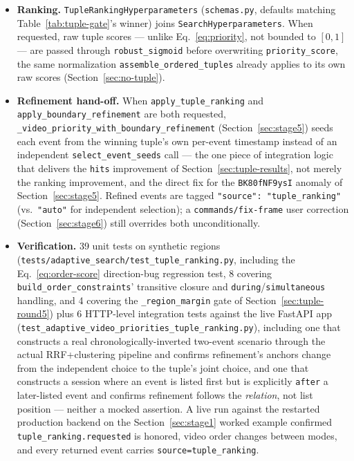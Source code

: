 \documentclass[11pt]{article}
\newcommand{\code}[1]{\texttt{\small #1}}
\newcommand{\file}[1]{\texttt{\footnotesize #1}}
\begin{document}
\begin{itemize}[nosep]
  \item \textbf{Ranking.} \code{TupleRankingHyperparameters}
    (\file{schemas.py}, defaults matching Table~\ref{tab:tuple-gate}'s winner)
    joins \code{SearchHyperparameters}. When requested, raw tuple scores ---
    unlike Eq.~\ref{eq:priority}, not bounded to $[0,1]$ --- are passed through
    \code{robust\_sigmoid} before overwriting \code{priority\_score}, the same
    normalization \code{assemble\_ordered\_tuples} already applies to its own
    raw scores (Section~\ref{sec:no-tuple}).
  \item \textbf{Refinement hand-off.} When \code{apply\_tuple\_ranking} and
    \code{apply\_boundary\_refinement} are both requested,
    \code{\_video\_priority\_with\_boundary\_refinement}
    (Section~\ref{sec:stage5}) seeds each event from the winning tuple's own
    per-event timestamp instead of an independent
    \code{select\_event\_seeds} call --- the one piece of integration logic
    that delivers the \code{hits} improvement of
    Section~\ref{sec:tuple-results}, not merely the ranking improvement, and
    the direct fix for the \code{BK80fNF9ysI} anomaly of
    Section~\ref{sec:stage5}. Refined events are tagged
    \code{"source": "tuple\_ranking"} (vs.\ \code{"auto"} for independent
    selection); a \code{commands/fix-frame} user correction
    (Section~\ref{sec:stage6}) still overrides both unconditionally.
  \item \textbf{Verification.} 39 unit tests on synthetic regions
    (\file{tests/adaptive\_search/test\_tuple\_ranking.py}, including the
    Eq.~\ref{eq:order-score} direction-bug regression test, 8 covering
    \code{build\_order\_constraints}' transitive closure and
    \code{during}/\code{simultaneous} handling, and 4 covering the
    \code{\_region\_margin} gate of Section~\ref{sec:tuple-round5}) plus 6 HTTP-level
    integration tests against the live FastAPI app
    (\file{test\_adaptive\_video\_priorities\_tuple\_ranking.py}), including
    one that constructs a real chronologically-inverted two-event scenario
    through the actual RRF+clustering pipeline and confirms refinement's
    anchors change from the independent choice to the tuple's joint choice,
    and one that constructs a session where an event is listed first but is
    explicitly \code{after} a later-listed event and confirms refinement
    follows the \emph{relation}, not list position --- neither a mocked
    assertion. A live run against the restarted production backend on the
    Section~\ref{sec:stage1} worked example confirmed
    \code{tuple\_ranking.requested} is honored, video order changes between
    modes, and every returned event carries \code{source=tuple\_ranking}.
\end{itemize}
\end{document}
